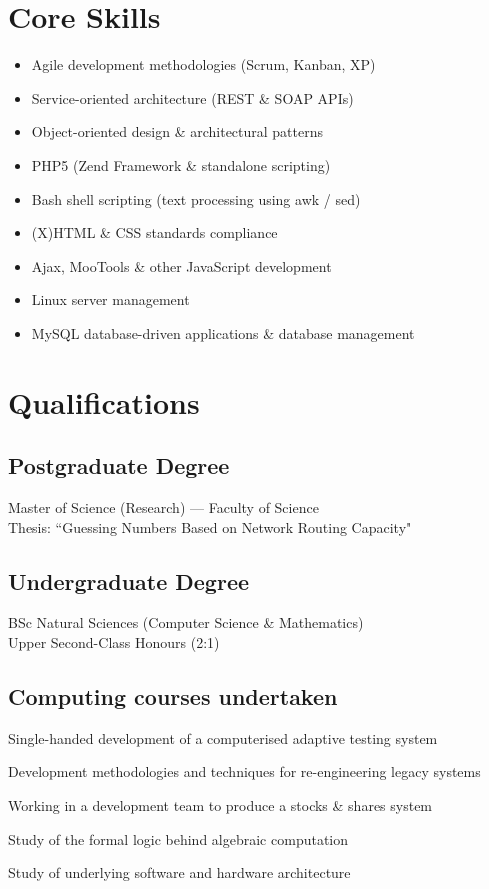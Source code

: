 \documentclass{cv}
\begin{document}
\section{Core Skills}

\begin{itemize}
\item Agile development methodologies (Scrum, Kanban, XP)
\item Service-oriented architecture (REST \& SOAP APIs)
\item Object-oriented design \& architectural patterns
\item PHP5 (Zend Framework \& standalone scripting)
\item Bash shell scripting (text processing using awk / sed)
\item (X)HTML \& CSS standards compliance
\item Ajax, MooTools \& other JavaScript development
\item Linux server management
\item MySQL database-driven applications \& database management
\end{itemize}

\section{Qualifications}

\subsection*{Postgraduate Degree}

Master of Science (Research) --- Faculty of Science\\
Thesis: ``Guessing Numbers Based on Network Routing Capacity"

\subsection*{Undergraduate Degree}

BSc Natural Sciences (Computer Science \& Mathematics)\\
Upper Second-Class Honours (2:1)

\subsection*{Computing courses undertaken}

\begin{description}[style=nextline]
\item[Computer science project] Single-handed development of a computerised adaptive testing system
\item[Software Engineering] Development methodologies and techniques for re-engineering legacy systems
\item[Group project] Working in a development team to produce a stocks \& shares system
\item[Formal Aspects] Study of the formal logic behind algebraic computation
\item[Computer Systems] Study of underlying software and hardware architecture
\end{description}
\end{document}
